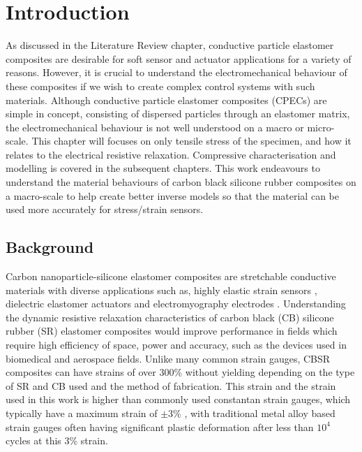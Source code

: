 \section{Introduction}
\label{sec:ch3-intro}
As discussed in the Literature Review chapter, conductive particle elastomer composites are desirable for soft sensor and actuator applications for a variety of reasons. However, it is crucial to understand the electromechanical behaviour of these composites if we wish to create complex control systems with such materials. Although conductive particle elastomer composites (CPECs) are simple in concept, consisting of dispersed particles through an elastomer matrix, the electromechanical behaviour is not well understood on a macro or micro-scale. This chapter will focuses on only tensile stress of the specimen, and how it relates to the electrical resistive relaxation. Compressive characterisation and modelling is covered in the subsequent chapters. This work endeavours to understand the material behaviours of carbon black silicone rubber composites on a macro-scale to help create better inverse models so that the material can be used more accurately for stress/strain sensors. 


\subsection{Background}
Carbon nanoparticle-silicone elastomer composites are stretchable conductive materials with diverse applications such as, highly elastic strain sensors \cite{Lacasse2010,Spahr2017,Kim2018}, dielectric elastomer actuators \cite{Henke2018,Liu2009} and electromyography electrodes \cite{Carpi2010,Kim2018,Mouri2019}. Understanding the dynamic resistive relaxation characteristics of carbon black (CB) silicone rubber (SR) elastomer composites would improve performance in fields which require high efficiency of space, power and accuracy, such as the devices used in biomedical and aerospace fields. Unlike many common strain gauges, CBSR composites can have strains of over 300\% without yielding \cite{Wang2010} depending on the type of SR and CB used and the method of fabrication. This strain and the strain used in this work is higher than commonly used constantan strain gauges, which typically have a maximum strain of $\pm 3$\% \cite{VishayPG2018}, with traditional metal alloy based strain gauges often having significant plastic deformation after less than $10^4$ cycles \cite{VishayPG2018} at this 3\% strain.


